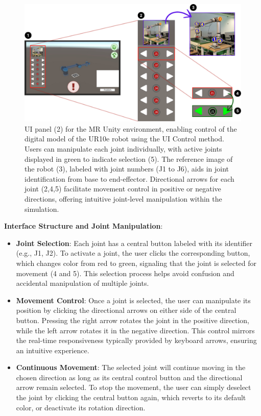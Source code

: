 \begin{figure}[h]
    \centering
    \includegraphics[width=\textwidth]{figs/interface-numerada-2.png}
    \caption{\ac{UI} panel (2) for the \ac{MR} Unity environment, enabling control of the digital model of the UR10e robot using the \ac{UI} Control method. Users can manipulate each joint individually, with active joints displayed in green to indicate selection (5). The reference image of the robot (3), labeled with joint numbers (J1 to J6), aids in joint identification from base to end-effector. Directional arrows for each joint (2,4,5) facilitate movement control in positive or negative directions, offering intuitive joint-level manipulation within the simulation.}
    \label{f:ui-control}
\end{figure}


\textbf{Interface Structure and Joint Manipulation}:
\begin{itemize}
    \item \textbf{Joint Selection}: Each joint has a central button labeled with its identifier (e.g., J1, J2). To activate a joint, the user clicks the corresponding button, which changes color from red to green, signaling that the joint is selected for movement (4 and 5). This selection process helps avoid confusion and accidental manipulation of multiple joints.

    \item \textbf{Movement Control}: Once a joint is selected, the user can manipulate its position by clicking the directional arrows on either side of the central button. Pressing the right arrow rotates the joint in the positive direction, while the left arrow rotates it in the negative direction. This control mirrors the real-time responsiveness typically provided by keyboard arrows, ensuring an intuitive experience.

    \item \textbf{Continuous Movement}: The selected joint will continue moving in the chosen direction as long as its central control button and the directional arrow remain selected. To stop the movement, the user can simply deselect the joint by clicking the central button again, which reverts to its default color, or deactivate its rotation direction.
\end{itemize}

